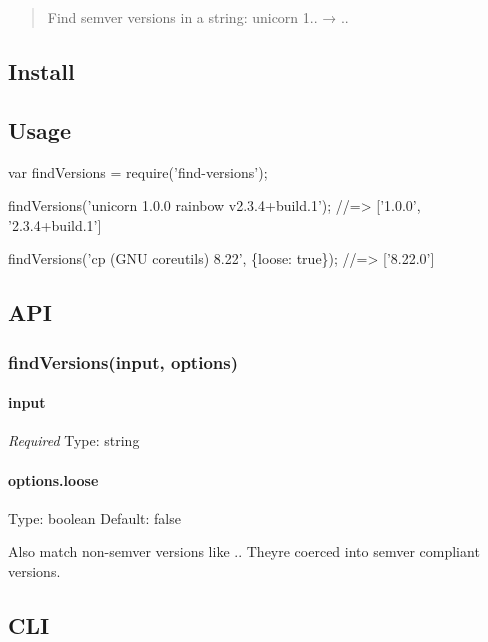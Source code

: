 \begin{quote}
Find semver versions in a string\+: {\ttfamily unicorn 1..} → {..} \end{quote}


\subsection*{Install}




\subsection*{Usage}


\begin{DoxyCode}
var findVersions = require('find-versions');

findVersions('unicorn 1.0.0 rainbow v2.3.4+build.1');
//=> ['1.0.0', '2.3.4+build.1']

findVersions('cp (GNU coreutils) 8.22', \{loose: true\});
//=> ['8.22.0']
\end{DoxyCode}


\subsection*{A\+PI}

\subsubsection*{find\+Versions(input, options)}

\paragraph*{input}

{\itshape Required} Type\+: {\ttfamily string}

\paragraph*{options.\+loose}

Type\+: {\ttfamily boolean} Default\+: {\ttfamily false}

Also match non-\/semver versions like {.}. They\textquotesingle{}re coerced into semver compliant versions.

\subsection*{C\+LI}


